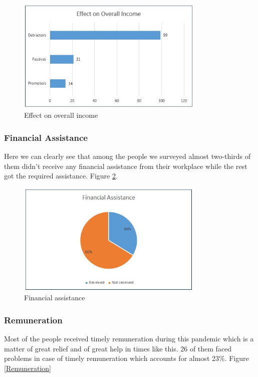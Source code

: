 \documentclass[11pt]{article}
\begin{document}
\begin{figure}[!ht]
	\centering
	\includegraphics[width=0.8\textwidth]{Images/Finance/Effect on Overall Income.jpg}
	\caption{Effect on overall income}
	\centering
	\label{effct in income}
\end{figure}

\subsubsection{Financial Assistance}
Here we can clearly see that among the people we surveyed almost two-thirds of them didn't receive any financial assistance from their workplace while the rest got the required assistance. Figure \ref{assistance}.

\begin{figure}[!ht]
	\centering
	\includegraphics[width=0.8\textwidth]{Images/Finance/Financial Assistance.jpg}
	\caption{Financial assistance}
	\centering
	\label{assistance}
\end{figure}

\subsubsection{Remuneration}
Most of the people received timely remuneration during this pandemic which is a matter of great relief and of great help in times like this. 26 of them faced problems in case of timely remuneration which accounts for almost 23\%. Figure \ref{Remuneration}
\end{document}
